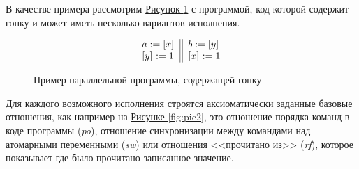 \documentclass[times
              ]{itmo-student-thesis}
\begin{document}
  В качестве примера рассмотрим \hyperref[fig:pic1]{Рисунок \ref{fig:pic1}} с программой, код которой
  содержит гонку и может иметь несколько вариантов исполнения.

  \begin{figure}[!h]
    \centering
    \begin{equation}
      \inarrII{
        \readInst{}{a}{x}  \\
        \writeInst{}{y}{1} \\
      }{
        \readInst{}{b}{y}  \\
        \writeInst{}{x}{1} \\
      }
    \end{equation}
    \caption{Пример параллельной программы, содержащей гонку}
    \label{fig:pic1}
  \end{figure}


  Для каждого возможного исполнения
  строятся аксиоматически заданные базовые отношения,
  как например на \hyperref[fig:pic2]{Рисунке \ref{fig:pic2}}, это
  отношение порядка команд в коде программы (\textit{po}), отношение синхронизации между командами над
  атомарными переменными (\textit{sw}) или отношения <<прочитано из>> (\textit{rf}),
  которое показывает где было прочитано записанное значение.
\end{document}
